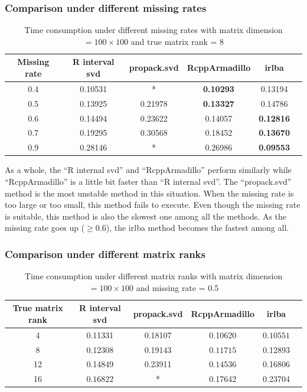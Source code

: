 \documentclass[12pt]{article}
\begin{document}
	\subsubsection{Comparison under different missing rates}
	
	\begin{table}[ht]
		\centering
		\caption{Time consumption under different missing rates with matrix dimension $=100\times 100$ and true matrix rank = 8 }\label{missing rate}
		\begin{tabular}{cccccc}
			\hline\hline
			Missing rate & R interval svd & propack.svd & RcppArmadillo & irlba\\
			\hline
		0.4&0.10531&*&\textbf{0.10293}&0.13194\\
		0.5&0.13925&0.21978&\textbf{0.13327}&0.14786\\
		0.6&0.14494&0.23622&0.14057&\textbf{0.12816}\\
		0.7&0.19295&0.30568&0.18452&\textbf{0.13670}\\
		0.9&0.28146&*&0.26986&\textbf{0.09553}\\
			\hline\hline
		\end{tabular}
	\end{table}
	
As a whole, the “R internal svd” and “RcppArmadillo” perform similarly while “RcppArmadillo” is a little bit faster than “R internal svd”. The “propack.svd” method is the most unstable method in this situation. When the missing rate is too large or too small, this method fails to execute. Even though the missing rate is suitable, this method is also the slowest one among all the methods. As the missing rate goes up ($\geq 0.6$), the irlba method becomes the fastest among all.

	\subsubsection{Comparison under different matrix ranks}
	
	\begin{table}[ht]
		\centering
		\caption{Time consumption under different matrix ranks with matrix dimension $=100\times 100$ and missing rate = 0.5}\label{rank}
		\begin{tabular}{cccccc}
			\hline\hline
			True matrix rank & R interval svd & propack.svd & RcppArmadillo & irlba\\
			\hline
4&0.11331&0.18107&0.10620&$\mathbf{0.10551}$\\
8&0.12308&0.19143&$\mathbf{0.11715}$&0.12893\\
12&0.14849&0.23911&$\mathbf{0.14536}$&0.16806\\
16&$\mathbf{0.16822}$&*&0.17642&0.23704\\
			\hline\hline
		\end{tabular}
	\end{table}
	
\end{document}
